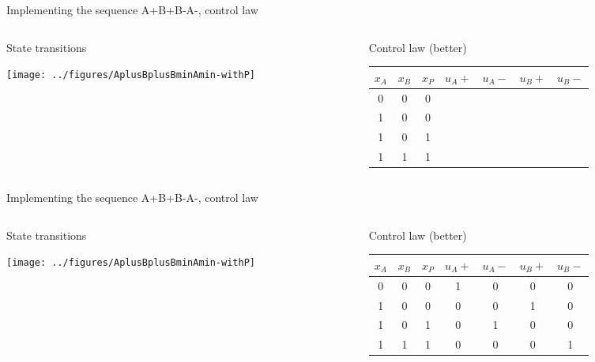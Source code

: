 \documentclass[presentation,aspectratio=1610]{beamer}
\begin{document}
\begin{frame}[label={sec:org4339779}]{Implementing the sequence A+B+B-A-, control law}
\begin{columns}
\begin{column}{0.4\columnwidth}
\begin{block}{State transitions}
\begin{center}
\texttt{[image: ../figures/AplusBplusBminAmin-withP]}
\end{center}
\end{block}
\end{column}

\begin{column}{0.6\columnwidth}
\begin{block}{Control law (better)}
\begin{center}
\begin{tabular}{|ccc|cccc|}
\hline
\(x_A\) & \(x_B\) & \(x_P\) & \(u_A+\) & \(u_A-\) & \(u_B+\) & \(u_B-\)\\
\hline
0 & 0 & 0 &  &  &  & \\
1 & 0 & 0 &  &  &  & \\
1 & 0 & 1 &  &  &  & \\
1 & 1 & 1 &  &  &  & \\
\hline
\end{tabular}
\end{center}
\end{block}
\end{column}
\end{columns}
\end{frame}


\begin{frame}[label={sec:org5db74ab}]{Implementing the sequence A+B+B-A-, control law}
\begin{columns}
\begin{column}{0.4\columnwidth}
\begin{block}{State transitions}
\begin{center}
\texttt{[image: ../figures/AplusBplusBminAmin-withP]}
\end{center}
\end{block}
\end{column}

\begin{column}{0.6\columnwidth}
\begin{block}{Control law (better)}
\begin{center}
\begin{tabular}{|ccc|cccc|}
\hline
\(x_A\) & \(x_B\) & \(x_P\) & \(u_A+\) & \(u_A-\) & \(u_B+\) & \(u_B-\)\\
\hline
0 & 0 & 0 & 1 & 0 & 0 & 0\\
1 & 0 & 0 & 0 & 0 & 1 & 0\\
1 & 0 & 1 & 0 & 1 & 0 & 0\\
1 & 1 & 1 & 0 & 0 & 0 & 1\\
\hline
\end{tabular}
\end{center}
\end{block}
\end{column}
\end{columns}
\end{frame}
\end{document}
